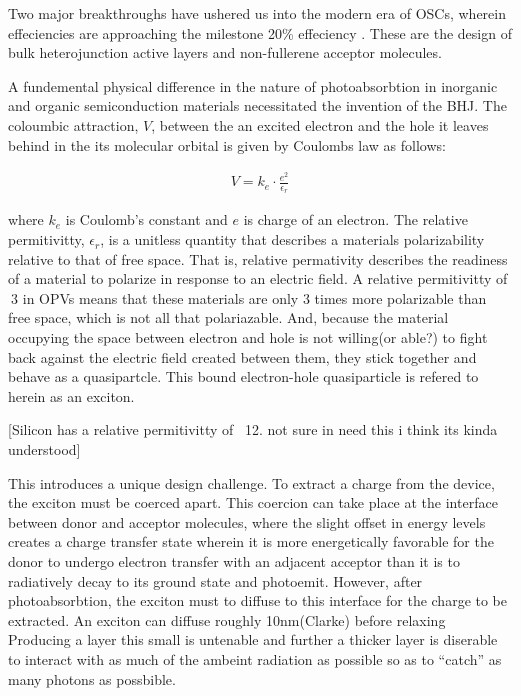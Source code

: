Two major breakthroughs have ushered us into the modern era of OSCs,
wherein effeciencies are approaching the milestone 20\% effeciency \cite{Liu2020b}.
These are the design of bulk heterojunction active layers and non-fullerene acceptor molecules. 

A fundemental physical difference in the nature of photoabsorbtion in inorganic and organic semiconduction materials necessitated the
invention of the BHJ. The coloumbic attraction, $V$, between the an excited
electron and the hole it leaves behind in the its molecular orbital
is given by Coulombs law as follows:

\begin{align}
    V  =  k_{e} \cdot \frac{e^{2}}{\epsilon_{r}}
\end{align}

where $k_{e}$ is Coulomb's constant and $e$ is charge of an electron. The relative permitivitty,
$\epsilon_{r}$, is a unitless quantity that describes a materials polarizability relative
to that of free space. That is, relative
permativity describes the readiness of a material
to polarize in response to an electric field. A
relative permitivitty of $~3$ in OPVs means that these materials are only $3$ times more polarizable than free space, which
is not all that polariazable. And, because the material occupying the space between electron and hole
is not willing(or able?) to fight back against the electric field created between them, they stick together and behave as a quasipartcle. 
This bound electron-hole quasiparticle is refered to herein as an exciton.

[Silicon has a relative permitivitty of ~12. not sure in need this i think its kinda understood]

This introduces a unique design challenge.
To extract a charge from the device, the exciton
must be coerced apart. This coercion can take place at the interface between donor and acceptor molecules,
where the slight offset in energy levels creates a charge transfer state wherein it is more
energetically favorable for the donor to undergo electron transfer with an adjacent acceptor than
it is to radiatively decay to its ground state and photoemit.
However, after photoabsorbtion, the exciton must to diffuse to this interface for the charge to be
extracted. An exciton can diffuse roughly 10nm(Clarke) before relaxing \cite{Clarke2010} 
Producing a layer this small is untenable and further a thicker layer
is diserable to interact with as much of the ambeint radiation as possible so as to ``catch'' as many photons
as possbible. 

